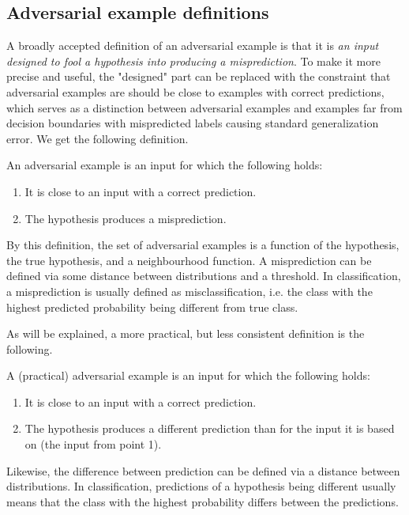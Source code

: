 \documentclass{article}
\begin{document}
\subsection{Adversarial example definitions} \label{sec:adversarial-example-definitions}
A broadly accepted definition of an adversarial example is that it is \textit{an input designed to fool a hypothesis into producing a misprediction}. To make it more precise and useful, the "designed" part can be replaced with the constraint that adversarial examples are should be close to examples with correct predictions, which serves as a distinction between adversarial examples and examples far from decision boundaries with mispredicted labels causing standard generalization error. We get the following definition.
\begin{definition} \label{def:ae-consistent}
	An adversarial example is an input for which the following holds:
	\begin{enumerate}
		\item It is close to an input with a correct prediction.
		\item The hypothesis produces a misprediction.
	\end{enumerate}
\end{definition}
By this definition, the set of adversarial examples is a function of the hypothesis, the true hypothesis, and a neighbourhood function. A misprediction can be defined via some distance between distributions and a threshold. In classification, a misprediction is usually defined as misclassification, i.e. the class with the highest predicted probability being different from true class.

As will be explained, a more practical, but less consistent definition is the following. 
\begin{definition} \label{def:ae-practical}
	A (practical) adversarial example is an input for which the following holds:
	\begin{enumerate}
		\item It is close to an input with a correct prediction.
		\item The hypothesis produces a different prediction than for the input it is based on (the input from point 1).
	\end{enumerate}
\end{definition}
Likewise, the difference between prediction can be defined via a distance between distributions.	
In classification, predictions of a hypothesis being different usually means that the class with the highest probability differs between the predictions.
\end{document}
